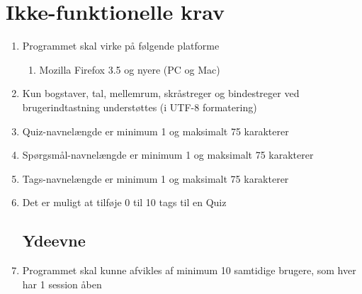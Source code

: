 \section{Ikke-funktionelle krav}
\label{sec:nonFunctional}
\begin{enumerate}
	\subsection*{Brugbarhed}
	\item Programmet skal virke på følgende platforme
	\begin{enumerate}
		\item Mozilla Firefox 3.5 og nyere (PC og Mac)
	\end{enumerate}
	
	\item Kun bogstaver, tal, mellemrum, skråstreger og bindestreger ved brugerindtastning understøttes (i UTF-8 formatering)
	\item Quiz-navnelængde er minimum 1 og maksimalt 75 karakterer
	\item Spørgsmål-navnelængde er minimum 1 og maksimalt 75 karakterer
	\item Tags-navnelængde er minimum 1 og maksimalt 75 karakterer 
	\item Det er muligt at tilføje 0 til 10 tags til en Quiz
	\subsection*{Ydeevne}
	\item Programmet skal kunne afvikles af minimum 10 samtidige brugere, som hver har 1 session åben
\end{enumerate}